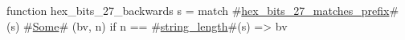 function hex_bits_27_backwards s =
  match #\hyperref[sailRISCVzhexzybitszy27zymatcheszyprefix]{hex\_bits\_27\_matches\_prefix}#(s) {
      #\hyperref[sailRISCVzSome]{Some}# (bv, n) if n == #\hyperref[sailRISCVzstringzylength]{string\_length}#(s) => bv
  }
